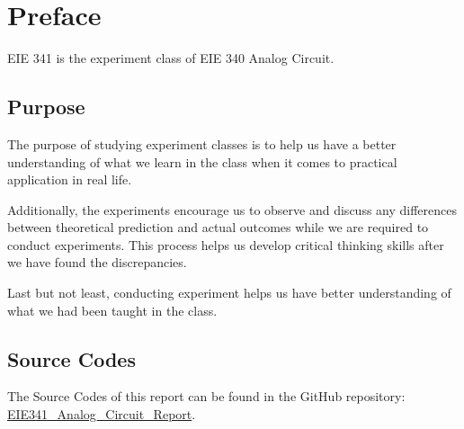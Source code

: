 \setcounter{chapter}{-1}
\chapter{Preface}
\Large EIE 341 is the experiment class of EIE 340 Analog Circuit.\par

\section{Purpose}

The purpose of studying experiment classes is to help us have a
better understanding of what we learn in the class when it comes to practical application in real life.\par

Additionally, the experiments encourage us to observe and discuss any differences between theoretical prediction and actual outcomes while we are required to conduct experiments. This process helps us develop critical thinking skills after we have found the discrepancies.\par

Last but not least, conducting experiment helps us have better understanding of what we had been taught in the class.

\section{Source Codes}
The Source Codes of this report can be found in the GitHub repository: 
    \href{https://github.com/xyZSean/EIE341_Analog_Circuit_Report}
        {EIE341\_Analog\_Circuit\_Report}.
\FloatBarrier